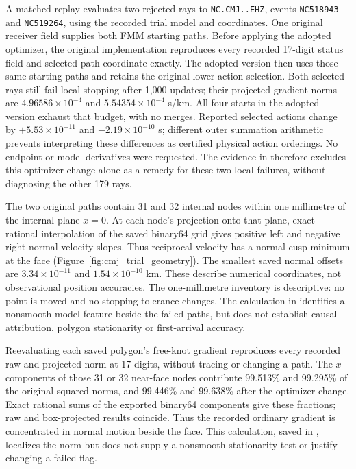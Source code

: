 A matched replay evaluates two rejected rays to \texttt{NC.CMJ..EHZ},
events \texttt{NC518943} and \texttt{NC519264}, using the recorded trial model
and coordinates. One original receiver field supplies both FMM starting
paths. Before applying the adopted optimizer, the original implementation
reproduces every recorded 17-digit status field and selected-path coordinate
exactly. The adopted version then uses those same starting paths and retains
the original lower-action selection. Both selected rays still fail local
stopping after 1,000 updates; their projected-gradient norms are
$4.96586\times10^{-4}$ and $5.54354\times10^{-4}$ s/km. All four starts in
the adopted version exhaust that budget, with no merges. Reported selected
actions change by $+5.53\times10^{-11}$ and $-2.19\times10^{-10}$ s;
different outer summation arithmetic prevents interpreting these differences
as certified physical action orderings. No endpoint or model derivatives
were requested. The evidence in
therefore excludes this optimizer change alone as a remedy for these two
local failures, without diagnosing the other 179 rays.

The two original paths contain 31 and 32 internal nodes within one millimetre
of the internal plane $x=0$. At each node's projection onto that plane,
exact rational interpolation of the saved binary64 grid gives positive
left and negative right normal velocity slopes. Thus reciprocal velocity
has a normal cusp minimum at the face (Figure~\ref{fig:cmj_trial_geometry}).
The smallest saved normal offsets are $3.34\times10^{-11}$ and
$1.54\times10^{-10}$ km. These describe numerical coordinates, not
observational position accuracies. The one-millimetre inventory is
descriptive: no point is moved and no stopping tolerance changes. The
calculation in 
identifies a nonsmooth model feature beside the failed paths, but does not
establish causal attribution, polygon stationarity or first-arrival accuracy.

Reevaluating each saved polygon's free-knot gradient reproduces every recorded
raw and projected norm at 17 digits, without tracing or changing a path.
The $x$ components of those 31 or 32 near-face nodes contribute
99.513\% and 99.295\% of the original squared norms, and 99.446\% and
99.638\% after the optimizer change. Exact rational sums of the exported
binary64 components give these fractions; raw and box-projected results
coincide. Thus the recorded ordinary gradient is concentrated in normal
motion beside the face. This calculation, saved in
, localizes the norm
but does not supply a nonsmooth stationarity test or justify changing a
failed flag.

